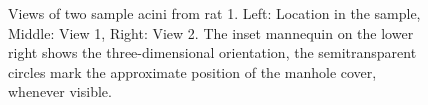 \documentclass[draft,a4paper,DIVcalc,abstract,english]{scrartcl}
\newlength\imagewidth		%
\newlength\imagescale		%
\begin{document}
\begin{figure}
{%
		}%
	\caption{Views of two sample acini from rat 1. Left: Location in the sample, Middle: View 1, Right: View 2. The inset mannequin on the lower right shows the three-dimensional orientation, the semitransparent circles mark the approximate position of the manhole cover, whenever visible.}
	\label{fig:acini}
\end{figure}
\end{document}
